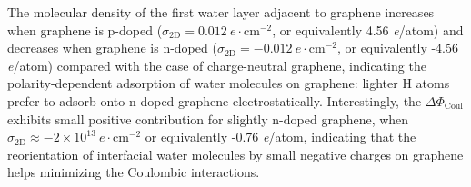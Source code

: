The molecular density of the first water layer adjacent
to graphene increases when graphene is p-doped
(\(\sigma_{\mathrm{2D}}=0.012\ e\cdot \mathrm{cm}^{-2}\), or
equivalently 4.56 \textit{e}/atom) and decreases when graphene is
n-doped (\(\sigma_{\mathrm{2D}}=-0.012\ e\cdot \mathrm{cm}^{-2}\), or
equivalently -4.56 \textit{e}/atom) compared with the case of
charge-neutral graphene, indicating the polarity-dependent adsorption
of water molecules on graphene: lighter H atoms prefer to adsorb onto
n-doped graphene electrostatically.
%
Interestingly, the
\(\Delta \Phi_{\mathrm{Coul}}\) exhibits small positive contribution
for slightly n-doped graphene, when
\(\sigma_{\mathrm{2D}} \approx -2\times10^{13}\ e\cdot
\mathrm{cm}^{-2}\) or equivalently -0.76 \textit{e}/atom, indicating
that the reorientation of interfacial water molecules by small
negative charges on graphene helps minimizing the Coulombic
interactions.

